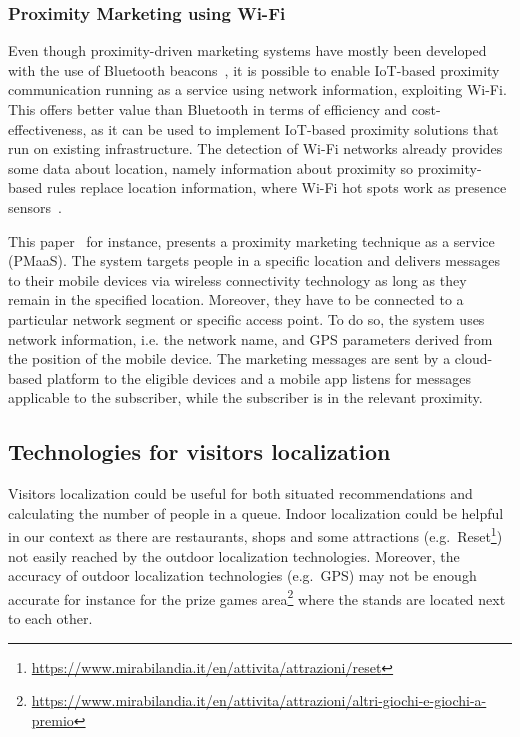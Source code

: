 \subsubsection{Proximity Marketing using Wi-Fi}\label{sec:proximity-marketing-wifi}
Even though proximity-driven marketing systems have mostly been developed with the use of Bluetooth beacons~\cite{mndebele2017iot}, it is possible to
enable IoT-based proximity communication running as a service using network information, exploiting Wi-Fi. This offers better value than Bluetooth in
terms of efficiency and cost-effectiveness, as it can be used to implement IoT-based proximity solutions that run on existing infrastructure. The
detection of Wi-Fi networks already provides some data about location, namely information about proximity so proximity-based rules replace location
information, where Wi-Fi hot spots work as presence sensors~\cite{dmitry2013network}.

This paper~\cite{mndebele2017iot} for instance, presents a proximity marketing technique as a service (PMaaS). The system targets people in a
specific location and delivers messages to their mobile devices via wireless connectivity technology as long as they remain in the specified
location. Moreover, they have to be connected to a particular network segment or specific access point. To do so, the system uses network
information, i.e. the network name, and GPS parameters derived from the position of the mobile device. The marketing messages are sent by a
cloud-based platform to the eligible devices and a mobile app listens for messages applicable to the subscriber, while the subscriber is in the
relevant proximity.

\subsection{Technologies for visitors localization}\label{sec:technologies}
Visitors localization could be useful for both situated recommendations and calculating the number of people in a queue. Indoor localization could be
helpful in our context as there are restaurants, shops and some attractions (e.g.\
Reset\footnote{\url{https://www.mirabilandia.it/en/attivita/attrazioni/reset}}) not easily reached by the outdoor localization technologies.
Moreover, the accuracy of outdoor localization technologies (e.g.\ GPS) may not be enough accurate for instance for the prize games
area\footnote{\url{https://www.mirabilandia.it/en/attivita/attrazioni/altri-giochi-e-giochi-a-premio}} where the stands are located next to each
other.

